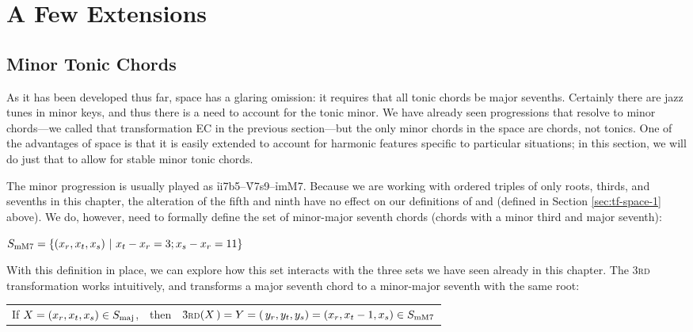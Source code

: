 

\section{A Few Extensions}
\label{sec:tf-extensions}

\subsection{Minor Tonic Chords}

As it has been developed thus far, \tf space has a glaring omission: it
requires that all tonic chords be major sevenths. Certainly there are jazz
tunes in minor keys, and thus there is a need to account for the tonic minor.
We have already seen \tf progressions that resolve to minor chords---we called
that transformation EC in the previous section---but the only minor chords in
the space are \ii chords, not tonics. One of the advantages of \tf space is
that it is easily extended to account for harmonic features specific to
particular situations; in this section, we will do just that to allow for
stable minor tonic chords.

The minor \tfmo progression is usually played as
\mbox{\h{ii7b5}--\h{V7s9}--\h{i\thinspace{}mM7}}. Because
we are working with ordered triples of only roots, thirds, and sevenths in
this chapter, the alteration of the fifth and ninth have no effect on our
definitions of \Smin and \Sdom (defined in Section \ref{sec:tf-space-1}
above). We do, however, need to formally define the set of minor-major seventh
chords (chords with a minor third and major seventh):

\vspace{.5\baselineskip}
  $S_{\mathrm{mM7}} = \{ (x_r, x_t, x_s)\ |\ x_t - x_r = 3; x_s - x_r = 11 \}$
\vspace{.5\baselineskip}

With this definition in place, we can explore how this set interacts with the
three sets we have seen already in this chapter. The \textsc{3rd}
transformation works intuitively, and transforms a major seventh chord to a
minor-major seventh with the same root:

\vspace{.5\baselineskip}
\begin{tabular}{lcl}
  If $X = (x_r, x_t, x_s) \in S_{\mathrm{maj}}$, & then &
     \h{3}\textsc{rd}$(X\,) = Y = (\,y_r, y_t, y_s)=(x_r, x_t-1, x_s) \in S_{\mathrm{mM7}}$
\end{tabular}
\vspace{.5\baselineskip}

